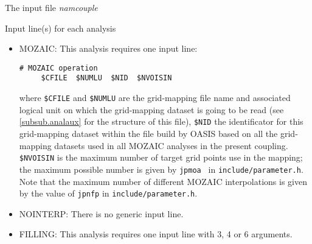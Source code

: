 \begin{subsection}{The input file {\it namcouple}}
\begin{subsubsection}{Input line(s) for each analysis}
\begin{itemize}
\begin{enumerate}
\item If the method chosen is the GAUSSIAN interpolation, the library
/lib/anaisg is used and the input line is
as  follows:
\begin{verbatim}
 # GAUSSIAN interpolation
$CMETHOD $CGRDSRC $CFLDTYP $NID $NVOISIN $VAR $NIO
\end{verbatim}
where {\tt \$CMETHOD} = GAUSSIAN, {\tt \$CGRDSRC} and {\tt \$CFLDTYP} 
are as for the BILINEAR interpolation,
{\tt \$NID} is the identificator for the relevant dataset 
of weights and addresses within the file {\em gweights} 
build by OASIS based on all
weight-and-addresse datasets in all GAUSSIAN analyses in the present
coupling. This weight-and-addresse dataset will be
calculated by OASIS if {\tt \$NIO}= 1, or will be only read by OASIS if 
{\tt \$NIO}= 0. {\tt \$NVOISIN} is the maximum number of neighbors used in
the interpolation; the maximum possible number is given by {\tt jpnoa
} in {\tt include/parameter.h}. {\tt \$VAR} is the variance of the 
gaussian function to be used in the interpolation (has to be given as
a REAL number, e.g 2.0 and not 2). Note that
the maximum number of different GAUSSIAN interpolations is given by the
value of {\tt jpnfg} in {\tt include/parameter.h}.
\end{enumerate}
\item MOZAIC: This analysis requires one input line:
\begin{verbatim}
# MOZAIC operation
     $CFILE  $NUMLU  $NID  $NVOISIN
\end{verbatim}
where {\tt \$CFILE} and {\tt \$NUMLU} are the grid-mapping file name and 
associated logical unit on which the grid-mapping dataset is going to be
read (see \ref{subsub.analaux} for the structure of this file), 
{\tt \$NID} the identificator
for this grid-mapping dataset 
within the file build by OASIS based on all
the grid-mapping datasets used in all MOZAIC analyses in the present
coupling. {\tt \$NVOISIN} is the maximum number of target grid points
use in the mapping; the maximum possible number is given by {\tt jpmoa
} in {\tt include/parameter.h}. Note that
the maximum number of different MOZAIC interpolations is given by the
value of {\tt jpnfp} in {\tt include/parameter.h}.


\item NOINTERP: There is no generic input line.

\item FILLING: This analysis requires one input line with 3, 4 or 6 
arguments. 


\end{itemize}
\end{subsubsection}
\end{subsection}
